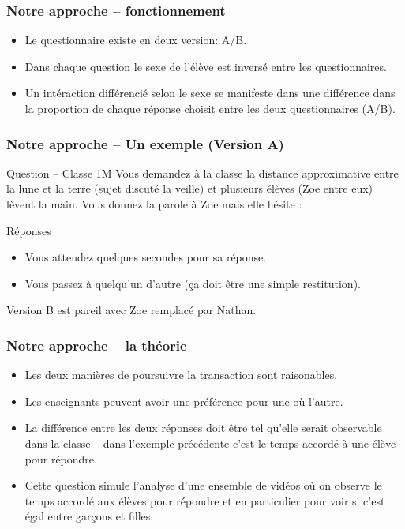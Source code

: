 \documentclass{beamer}
\begin{document}
\begin{frame}
\frametitle{Notre approche -- fonctionnement}
\begin{itemize}
\item Le questionnaire existe en deux version: A/B.
\item Dans chaque question le sexe de l'élève est inversé entre les questionnaires.
\item Un intéraction différencié selon le sexe se manifeste dans une différence
dans la proportion de chaque réponse choisit entre les deux questionnaires (A/B). 
  
\end{itemize}
\end{frame}


\begin{frame}
\frametitle{Notre approche -- Un exemple (Version A)}
\begin{block}{Question – Classe 1M}
Vous demandez à la classe la distance approximative entre la lune et la terre (sujet discuté la veille) et plusieurs élèves (Zoe entre eux) lèvent la main. Vous donnez la parole à Zoe mais elle hésite :
\end{block}

\begin{block}{Réponses}
\begin{itemize}
\item Vous attendez quelques secondes pour sa réponse.
\item Vous passez à quelqu’un d’autre (ça doit être une simple restitution).
\end{itemize}
\end{block}

Version B est pareil avec Zoe remplacé par Nathan.
\end{frame}

\begin{frame}
\frametitle{Notre approche -- la théorie}
\begin{itemize}
\item Les deux manières de poursuivre la transaction sont raisonables.
\item Les enseignants peuvent avoir une préférence pour une où l'autre.
\item La différence entre les deux réponses doit être tel qu'elle serait
  observable dans la classe -- dans l'exemple précédente c'est le temps
  accordé à une élève pour répondre.
\item Cette question simule l'analyse d'une ensemble de vidéos où on
  observe le temps accordé aux élèves pour répondre et en particulier
  pour voir si c'est égal entre garçons et filles.
\end{itemize}
\end{frame}
\end{document}
